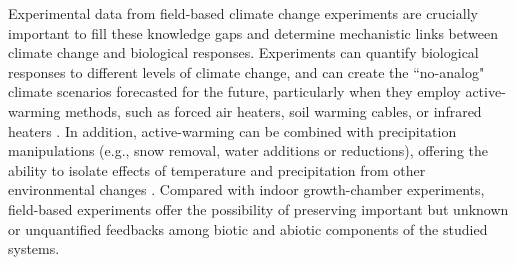 \documentclass{article}
\begin{document}
\par Experimental data from field-based climate change experiments are crucially important to fill these knowledge gaps and determine mechanistic links between climate change and biological responses. Experiments can quantify biological responses to different levels of climate change, and can create the ``no-analog" climate scenarios forecasted for the future, particularly when they employ active-warming methods, such as forced air heaters, soil warming cables, or infrared heaters \citep{shaver2000,williams2007b,aronson2009}. In addition, active-warming can be combined with precipitation manipulations (e.g., snow removal, water additions or reductions), offering the ability to isolate effects of temperature and precipitation from other environmental changes \citep [e.g.,][]{price1998,cleland2006,sherry2007,rollinson2012}. Compared with indoor growth-chamber experiments, field-based experiments offer the possibility of preserving important but unknown or unquantified feedbacks among biotic and abiotic components of the studied systems. %
\end{document}
